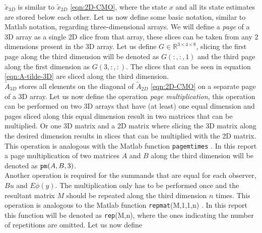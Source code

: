 $\tilde{x}_{3D}$ is similar to $\tilde{x}_{2D}$ \eqref{eqn:2D-CMO}, where the state $x$ and all its state estimates are stored below each other. Let us now define some basic notation, similar to Matlab notation, regarding three-dimensional arrays. We will define a \textit{page} of a 3D array as a single 2D slice from that array, these slices can be taken from any 2 dimensions present in the 3D array. Let us define $G \in \mathbb{R}^{3 \times 4 \times 8}$, slicing the first page along the third dimension will be denoted as $G(:,:,1)$ and the third page along the first dimension as $G(3,:,:)$. The slices that can be seen in equation \eqref{eqn:A-tilde-3D} are sliced along the third dimension. \\
$\tilde{A}_{3D}$ stores all elements on the diagonal of $\tilde{A}_{2D}$ \eqref{eqn:2D-CMO} on a separate page of a 3D array. Let us now define the operation \textit{page multiplication}, this operation can be performed on two 3D arrays that have (at least) one equal dimension and pages sliced along this equal dimension result in two matrices that can be multiplied. Or one 3D matrix and a 2D matrix where slicing the 3D matrix along the desired dimension results in slices that can be multiplied with the 2D matrix. This operation is analogous with the Matlab function \texttt{pagemtimes} \cite{2022MATLABR2022b}. In this report a page multiplication of two  matrices $A$ and $B$ along the third dimension will be denoted as $ \texttt{pm}(A,B,3)$. \\
Another operation is required for the summands that are equal for each observer, $Bu$ and $E\phi(y)$. The multiplication only has to be performed once and the resultant matrix $M$ should be repeated along the third dimension $n$ times. This operation is analogous to the Matlab function \texttt{repmat}(M,1,1,n) \cite{2022MATLABR2022b}. In this report this function will be denoted as \texttt{rep}(M,n), where the ones indicating the number of repetitions are omitted. Let us now define

